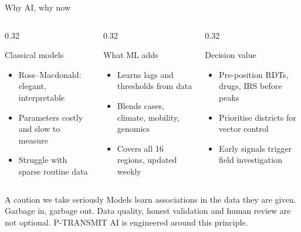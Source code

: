 \documentclass[aspectratio=169,11pt]{beamer}
\begin{document}
\begin{frame}{Why AI, why now}
  \begin{columns}[c]
    \begin{column}{0.32\textwidth}
      \begin{block}{Classical models}
        \begin{itemize}\small
          \item Ross--Macdonald: elegant, interpretable
          \item Parameters costly and slow to measure
          \item Struggle with sparse routine data
        \end{itemize}
      \end{block}
    \end{column}
    \begin{column}{0.32\textwidth}
      \begin{alertblock}{What ML adds}
        \begin{itemize}\small
          \item Learns lags and thresholds from data
          \item Blends cases, climate, mobility, genomics
          \item Covers all 16 regions, updated weekly
        \end{itemize}
      \end{alertblock}
    \end{column}
    \begin{column}{0.32\textwidth}
      \begin{block}{Decision value}
        \begin{itemize}\small
          \item Pre-position RDTs, drugs, IRS before peaks
          \item Prioritise districts for vector control
          \item Early signals trigger field investigation
        \end{itemize}
      \end{block}
    \end{column}
  \end{columns}
  \vspace{3mm}
  \begin{block}{A caution we take seriously}
    Models learn associations in the data they are given. Garbage in, garbage
    out. Data quality, honest validation and human review are not optional.
    P-TRANSMIT AI is engineered around this principle.
  \end{block}
\end{frame}
\end{document}
